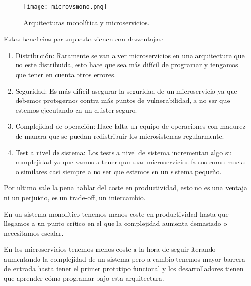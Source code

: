 \begin{figure}
	\centering
	\texttt{[image: microvsmono.png]}
	\caption{Arquitecturas monolítica y microservicios.}\label{fig:microvsmono.png}
\end{figure}

Estos beneficios por supuesto vienen con desventajas:

\begin{enumerate}
\item Distribución: Raramente se van a ver microservicios en una arquitectura que no este distribuida, esto hace que sea más difícil de programar y tengamos que tener en cuenta otros errores.
\item Seguridad: Es más difícil asegurar la seguridad de un microservicio ya que debemos protegernos contra más puntos de vulnerabilidad, a no ser que estemos ejecutando en un clúster seguro.
\item Complejidad de operación: Hace falta un equipo de operaciones con madurez de manera que se puedan redistribuir los microsistemas regularmente.
\item Test a nivel de sistema: Los tests a nivel de sistema incrementan algo su complejidad ya que vamos a tener que usar microservicios falsos como mocks o similares casi siempre a no ser que estemos en un sistema pequeño.
\end{enumerate}

Por ultimo vale la pena hablar del coste en productividad, esto no es una ventaja ni un perjuicio, es un trade-off, un intercambio.

En un sistema monolítico tenemos menos coste en productividad hasta que llegamos a un punto crítico en el que la complejidad aumenta demasiado o necesitamos escalar.

En los microservicios tenemos menos coste a la hora de seguir iterando aumentando la complejidad de un sistema pero a cambio tenemos mayor barrera de entrada hasta tener el primer prototipo funcional y los desarrolladores tienen que aprender cómo programar bajo esta arquitectura.
